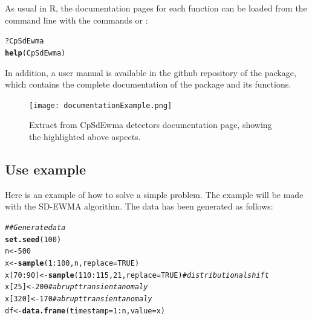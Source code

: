 \documentclass[a4paper]{article}\usepackage[]{graphicx}\usepackage[]{color}
\makeatletter
\newcommand{\hlnum}[1]{\textcolor[rgb]{0.686,0.059,0.569}{#1}}%
\newcommand{\hlcom}[1]{\textcolor[rgb]{0.678,0.584,0.686}{\textit{#1}}}%
\newcommand{\hlopt}[1]{\textcolor[rgb]{0,0,0}{#1}}%
\newcommand{\hlstd}[1]{\textcolor[rgb]{0.345,0.345,0.345}{#1}}%
\newcommand{\hlkwb}[1]{\textcolor[rgb]{0.69,0.353,0.396}{#1}}%
\newcommand{\hlkwc}[1]{\textcolor[rgb]{0.333,0.667,0.333}{#1}}%
\newcommand{\hlkwd}[1]{\textcolor[rgb]{0.737,0.353,0.396}{\textbf{#1}}}%
\newenvironment{kframe}{%
 \def\at@end@of@kframe{}%
 \ifinner\ifhmode%
  \def\at@end@of@kframe{\end{minipage}}%
  \begin{minipage}{\columnwidth}%
 \fi\fi%
 \def\FrameCommand##1{\hskip\@totalleftmargin \hskip-\fboxsep
 \colorbox{shadecolor}{##1}\hskip-\fboxsep
     \hskip-\linewidth \hskip-\@totalleftmargin \hskip\columnwidth}%
 \MakeFramed {\advance\hsize-\width
   \@totalleftmargin\z@ \linewidth\hsize
   \@setminipage}}%
 {\par\unskip\endMakeFramed%
 \at@end@of@kframe}
\newenvironment{knitrout}{}{} %
\makeatother
\begin{document}
As usual in R, the documentation pages for each function can be loaded from the command line with the commands  or :

\begin{knitrout}
\color{fgcolor}\begin{kframe}
\begin{alltt}
\hlopt{?}\hlstd{CpSdEwma}
\hlkwd{help}\hlstd{(CpSdEwma)}
\end{alltt}
\end{kframe}
\end{knitrout}

In addition, a user manual is available in the github repository of the   package, which contains the complete documentation of the package and its functions.

\begin{figure}[htbp]
\centering
\texttt{[image: documentationExample.png]}
\caption{Extract from CpSdEwma detectors documentation page, showing the highlighted above aspects.}
\label{fig:documentation}
\end{figure}

\newpage

\subsection{Use example}\label{sec:example}

Here is an example of how to solve a simple problem. The example will be made with the SD-EWMA algorithm. The data has been generated as follows:

\begin{knitrout}
\color{fgcolor}\begin{kframe}
\begin{alltt}
\hlcom{## Generate data}
\hlkwd{set.seed}\hlstd{(}\hlnum{100}\hlstd{)}
\hlstd{n} \hlkwb{<-} \hlnum{500}
\hlstd{x} \hlkwb{<-} \hlkwd{sample}\hlstd{(}\hlnum{1}\hlopt{:}\hlnum{100}\hlstd{, n,} \hlkwc{replace} \hlstd{=} \hlnum{TRUE}\hlstd{)}
\hlstd{x[}\hlnum{70}\hlopt{:}\hlnum{90}\hlstd{]} \hlkwb{<-} \hlkwd{sample}\hlstd{(}\hlnum{110}\hlopt{:}\hlnum{115}\hlstd{,} \hlnum{21}\hlstd{,} \hlkwc{replace} \hlstd{=} \hlnum{TRUE}\hlstd{)} \hlcom{# distributional shift}
\hlstd{x[}\hlnum{25}\hlstd{]} \hlkwb{<-} \hlnum{200} \hlcom{# abrupt transient anomaly}
\hlstd{x[}\hlnum{320}\hlstd{]} \hlkwb{<-} \hlnum{170} \hlcom{# abrupt transient anomaly}
\hlstd{df} \hlkwb{<-} \hlkwd{data.frame}\hlstd{(}\hlkwc{timestamp} \hlstd{=} \hlnum{1}\hlopt{:}\hlstd{n,} \hlkwc{value} \hlstd{= x)}
\end{alltt}
\end{kframe}
\end{knitrout}
\end{document}
